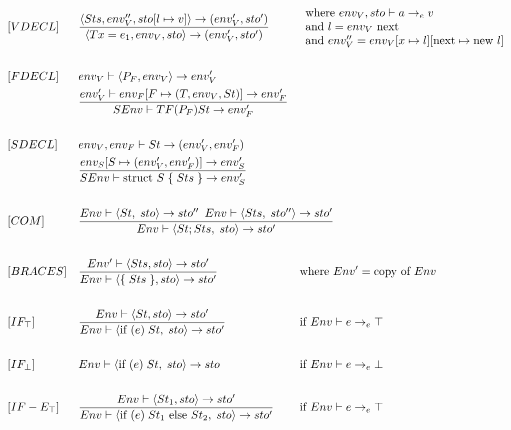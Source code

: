 \begin{align*}
&[VDECL]&&\frac{\langle Sts,env''_V, sto[l\mapsto v]\rangle\to(env'_V,sto')}{\langle T x = e_1, env_V, sto\rangle\to(env'_V,sto')}&&\begin{array}{l}
    \text{where } env_V, sto\vdash a\to_e v\\
    \text{and } l = env_V \text{ next}\\
    \text{and } env_V'' = env_V[x\mapsto l][\text{next}\mapsto \text{new } l]
\end{array}\\\\
%
%
&[FDECL]&&env_V\vdash\langle P_F, env_V\rangle\to env'_V\\
&&&\frac{env'_V\vdash env_F[F\mapsto(T,env_V, St)]\to env'_F}{SEnv\vdash T F(P_F) St\to env'_F}\\\\
%
&[SDECL]&&env_V, env_F\vdash St\to (env'_V, env_F')\\
&&&\frac{env_S[S\mapsto (env_V', env_F')]\to env_S'}{SEnv\vdash \text{struct } S \; \{\;Sts\;\}\to env'_S}\\\\
%
&[COM] & &\frac{Env \vdash \langle St, \; sto \rangle \rightarrow sto^{\prime\prime} \enskip Env \vdash \langle Sts, \; sto^{\prime\prime} \rangle \rightarrow sto^\prime}{Env \vdash \langle St; Sts, \; sto \rangle \rightarrow sto^\prime} \span \span \\\\
%
&[BRACES]&&\frac{Env^\prime\vdash\langle Sts, sto\rangle \to sto^\prime}{Env\vdash\langle\{\;Sts\;\}, sto\rangle\to sto^\prime }& & \text{where } Env^\prime = \text{copy of } Env\\\\
%
&[IF_\top] & &\frac{Env \vdash \langle St, sto \rangle \rightarrow sto^\prime}{Env \vdash \langle \text{if } (e)\; St,\; sto \rangle \rightarrow sto^\prime} & &\text{if } Env \vdash e \rightarrow_e \top\\\\
%
&[IF_\bot] & &Env \vdash \langle \text{if } (e)\; St,\; sto \rangle \rightarrow sto & &\text{if } Env \vdash e \rightarrow_e \bot\\\\
%
&[IF-E_\top] & &\frac{Env \vdash \langle St_1, sto \rangle \rightarrow sto^\prime}{Env \vdash \langle \text{if } (e)\;St_1 \text{ else } St_2,\; sto \rangle \rightarrow sto^\prime} & &\text{if } Env \vdash e \rightarrow_e \top\\\\

\end{align*}
